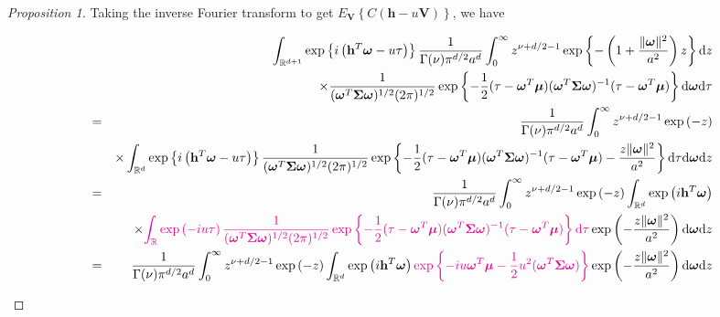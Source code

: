 \documentclass[12pt]{article}
\newcommand{\0}{\mathbf{0}}
\newtheorem{proof}{Proof}
\begin{document}
\begin{proof}[Proposition 1]
Taking the inverse Fourier transform to get $E_{\mathbf{V}}\left\{C\left(\mathbf{h}-u\mathbf{V}\right)\right\}$, we have
\begin{small}
\begin{eqnarray}
&&\int_{\mathbb{R}^{d+1}} \exp \left\{i\left(\mathbf{h}^T\boldsymbol{\omega}-u\tau\right)\right\}\frac{1}{ \Gamma(\nu)\pi^{d/2}a^{d}} \int_0^{\infty}z^{\nu+d/2-1} \exp\left\{-\left(1+\frac{ \|\boldsymbol{\omega}\|^2}{a^2}\right)z\right\}\dd z \nonumber \\
&&\times  \frac{1}{(\boldsymbol{\omega}^T\boldsymbol{\Sigma}\boldsymbol{\omega})^{1/2}(2\pi)^{1/2}} \exp\left\{-\frac{1}{2}(\tau-\boldsymbol{\omega}^T\boldsymbol{\mu})(\boldsymbol{\omega}^T\boldsymbol{\Sigma}\boldsymbol{\omega})^{-1}(\tau-\boldsymbol{\omega}^T\boldsymbol{\mu})\right\} \dd \boldsymbol{\omega} \dd \tau \nonumber \\
&=&\frac{1}{ \Gamma(\nu)\pi^{d/2}a^{d}} \int_0^{\infty}z^{\nu+d/2-1} \exp\left(-z\right) \nonumber \\
&& \times \int_{\mathbb{R}^d}  \exp \left\{i\left(\mathbf{h}^T\boldsymbol{\omega}-u\tau\right)\right\}\frac{1}{(\boldsymbol{\omega}^T\boldsymbol{\Sigma}\boldsymbol{\omega})^{1/2}(2\pi)^{1/2}} \exp\left\{-\frac{1}{2}(\tau-\boldsymbol{\omega}^T\boldsymbol{\mu})(\boldsymbol{\omega}^T\boldsymbol{\Sigma}\boldsymbol{\omega})^{-1}(\tau-\boldsymbol{\omega}^T\boldsymbol{\mu})-\frac{ z\|\boldsymbol{\omega}\|^2}{a^2}\right\}  \dd \tau \dd \boldsymbol{\omega}  \dd z\nonumber \\
&=&\frac{1}{ \Gamma(\nu)\pi^{d/2}a^{d}} \int_0^{\infty}z^{\nu+d/2-1} \exp\left(-z\right)\int_{\mathbb{R}^d}  \exp\left(i\mathbf{h}^T\boldsymbol{\omega}\right)  \nonumber \\
&& \times \textcolor{magenta}{\int_{\mathbb{R}}\exp \left(-iu\tau\right) \frac{1}{(\boldsymbol{\omega}^T\boldsymbol{\Sigma}\boldsymbol{\omega})^{1/2}(2\pi)^{1/2}} \exp\left\{-\frac{1}{2}(\tau-\boldsymbol{\omega}^T\boldsymbol{\mu})(\boldsymbol{\omega}^T\boldsymbol{\Sigma}\boldsymbol{\omega})^{-1}(\tau-\boldsymbol{\omega}^T\boldsymbol{\mu})\right\}  \dd \tau} \exp\left(-\frac{ z\|\boldsymbol{\omega}\|^2}{a^2}\right)  \dd \boldsymbol{\omega}  \dd z\label{eqn:CFoftau} \\
&=&\frac{1}{ \Gamma(\nu)\pi^{d/2}a^{d}} \int_0^{\infty}z^{\nu+d/2-1} \exp\left(-z\right)\int_{\mathbb{R}^d}  \exp\left(i\mathbf{h}^T\boldsymbol{\omega}\right) \textcolor{magenta}{ \exp\left\{-iu\boldsymbol{\omega}^T\boldsymbol{\mu}-\frac{1}{2}u^2(\boldsymbol{\omega}^T\boldsymbol{\Sigma}\boldsymbol{\omega})\right\}} \exp\left(-\frac{ z\|\boldsymbol{\omega}\|^2}{a^2}\right)  \dd \boldsymbol{\omega}  \dd z \nonumber \\

\end{eqnarray}
\end{small}
\end{proof}
\end{document}
